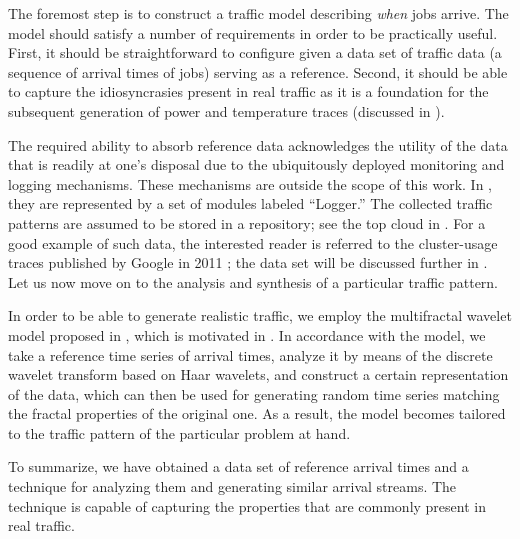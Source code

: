 The foremost step is to construct a traffic model describing \emph{when} jobs
arrive. The model should satisfy a number of requirements in order to be
practically useful. First, it should be straightforward to configure given a
data set of traffic data (a sequence of arrival times of jobs) serving as a
reference. Second, it should be able to capture the idiosyncrasies present in
real traffic as it is a foundation for the subsequent generation of power and
temperature traces (discussed in ).

The required ability to absorb reference data acknowledges the utility of the
data that is readily at one's disposal due to the ubiquitously deployed
monitoring and logging mechanisms. These mechanisms are outside the scope of
this work. In , they are represented by a set of modules
labeled ``Logger.'' The collected traffic patterns are assumed to be stored in a
repository; see the top cloud in . For a good example of such
data, the interested reader is referred to the cluster-usage traces published by
Google in 2011 \cite{google}; the data set will be discussed further in
. Let us now move on to the analysis and synthesis of a particular
traffic pattern.

In order to be able to generate realistic traffic, we employ the multifractal
wavelet model proposed in \cite{riedi1999}, which is motivated in
. In accordance with the model, we take a reference time series
of arrival times, analyze it by means of the discrete wavelet transform based on
Haar wavelets, and construct a certain representation of the data, which can
then be used for generating random time series matching the fractal properties
of the original one. As a result, the model becomes tailored to the traffic
pattern of the particular problem at hand.

To summarize, we have obtained a data set of reference arrival times and a
technique for analyzing them and generating similar arrival streams. The
technique is capable of capturing the properties that are commonly present in
real traffic.
